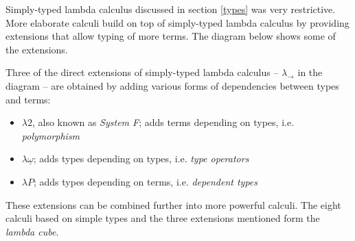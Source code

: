 \documentclass[11pt,twoside,a4paper]{article} %
\begin{document}
Simply-typed lambda calculus discussed in section \ref{types} was very restrictive. More 
elaborate calculi build on top of simply-typed lambda calculus by providing
extensions that allow typing of more terms. The diagram below shows some of the 
extensions.
\begin{center}
\end{center}
Three of the direct extensions of simply-typed lambda calculus -- $\lambda_\rightarrow$ in the
diagram -- are obtained by adding various forms of dependencies between types
and terms:
\begin{itemize}
\item $\lambda 2$, also known as \emph{System F}; adds terms depending on
types, i.e. \emph{polymorphism}
\item $\lambda\underline{\omega}$; adds types depending on types, i.e. \emph{type
operators}
\item $\lambda P$; adds types depending on terms, i.e. \emph{dependent types}
\end{itemize}
These extensions can be combined further into more powerful calculi. The eight
calculi based on simple types and the three extensions mentioned form the
\emph{lambda cube}\cite{b91}.
\end{document}
